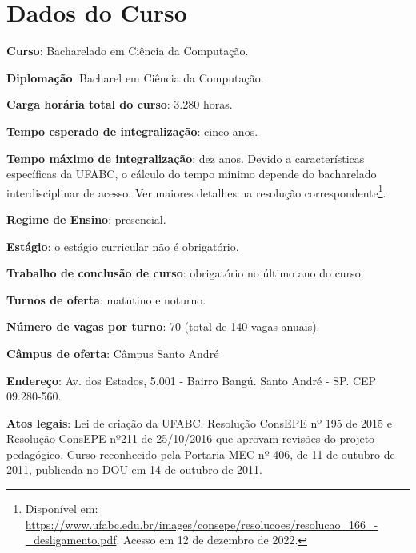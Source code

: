 \section{Dados do Curso}
\label{sec:dados_curso}

\textbf{Curso}: Bacharelado em Ciência da Computação.

\textbf{Diplomação}: Bacharel em Ciência da Computação.

\textbf{Carga horária total do curso}: 3.280 horas.

\textbf{Tempo esperado de integralização}: cinco anos.  

\textbf{Tempo máximo de integralização}: dez anos. Devido a características
específicas da UFABC, o cálculo do tempo mínimo depende do bacharelado
interdisciplinar de acesso. Ver maiores detalhes na resolução
correspondente\footnote{Disponível em:
\url{https://www.ufabc.edu.br/images/consepe/resolucoes/resolucao_166_-_desligamento.pdf}.
Acesso em 12 de dezembro de 2022.}.

\textbf{Regime de Ensino}: presencial.

\textbf{Estágio}: o estágio curricular não é obrigatório.

\textbf{Trabalho de conclusão de curso}: obrigatório no último ano do curso.

\textbf{Turnos de oferta}: matutino e noturno.

\textbf{Número de vagas por turno}: 70 (total de 140 vagas anuais).

\textbf{Câmpus de oferta}: Câmpus Santo André

\textbf{Endereço}: Av. dos Estados, 5.001 - Bairro Bangú. Santo André
- SP. CEP 09.280-560.

\textbf{Atos legais}: Lei de criação da UFABC. Resolução ConsEPE nº
195 de 2015 e Resolução ConsEPE nº211 de 25/10/2016 que aprovam
revisões do projeto pedagógico. Curso reconhecido pela Portaria MEC nº
406, de 11 de outubro de 2011, publicada no DOU em 14 de outubro de
2011.
